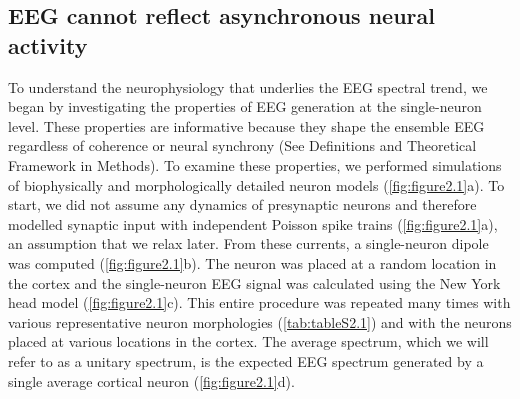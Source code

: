 \subsection{EEG cannot reflect asynchronous neural activity}
To understand the neurophysiology that underlies the EEG spectral trend, we began by investigating the properties of EEG generation at the single-neuron level. These properties are informative because they shape the ensemble EEG regardless of coherence or neural synchrony (See Definitions and Theoretical Framework in Methods). To examine these properties, we performed simulations of biophysically and morphologically detailed neuron models (\autoref{fig:figure2.1}a). To start, we did not assume any dynamics of presynaptic neurons and therefore modelled synaptic input with independent Poisson spike trains (\autoref{fig:figure2.1}a), an assumption that we relax later. From these currents, a single-neuron dipole was computed\cite{Næss2021} (\autoref{fig:figure2.1}b). The neuron was placed at a random location in the cortex and the single-neuron EEG signal was calculated using the New York head model\cite{Huang2016} (\autoref{fig:figure2.1}c). This entire procedure was repeated many times with various representative neuron morphologies (\autoref{tab:tableS2.1}) and with the neurons placed at various locations in the cortex. The average spectrum, which we will refer to as a unitary spectrum, is the expected EEG spectrum generated by a single average cortical neuron (\autoref{fig:figure2.1}d). 


